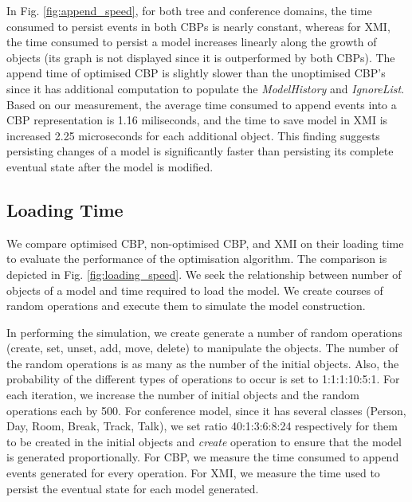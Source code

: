 \documentclass{llncs}
\begin{document}
In Fig. \ref{fig:append_speed}, for both tree and conference domains, the time consumed to persist events in both CBPs is nearly constant, whereas for XMI, the time consumed to persist a model increases linearly along the growth of objects (its graph is not displayed since it is outperformed by both CBPs). The append time of optimised CBP is slightly slower than the unoptimised CBP's since it has additional computation to populate the \emph{ModelHistory} and \emph{IgnoreList}. Based on our measurement, the average time consumed to append events into a CBP representation is 1.16 miliseconds, and the time to save model in XMI is increased 2.25 microseconds for each additional object. This finding suggests persisting changes of a model is significantly faster than persisting its complete eventual state after the model is modified.    

\subsection{Loading Time}
\label{subsec:loading_time_test}
We compare optimised CBP, non-optimised CBP, and XMI on their loading time to evaluate the performance of the optimisation algorithm. The  comparison is depicted in Fig. \ref{fig:loading_speed}. We seek the relationship between number of objects of a model and time required to load the model. We create courses of random operations and execute them to simulate the model construction.   

In performing the simulation, we create generate a number of random operations (create, set, unset, add, move, delete) to manipulate the objects. The number of the random operations is as many as the number of the initial objects. Also, the probability of the different types of operations to occur is set to 1:1:1:10:5:1. For each iteration, we increase the number of initial objects and the random operations each by 500. For conference model, since it has several classes (Person, Day, Room, Break, Track, Talk), we set ratio 40:1:3:6:8:24 respectively for them to be created in the initial objects and \emph{create} operation to ensure that the model is generated proportionally. For CBP, we measure the time consumed to append events generated for every operation. For XMI, we measure the time used to persist the eventual state for each model generated.
\end{document}
